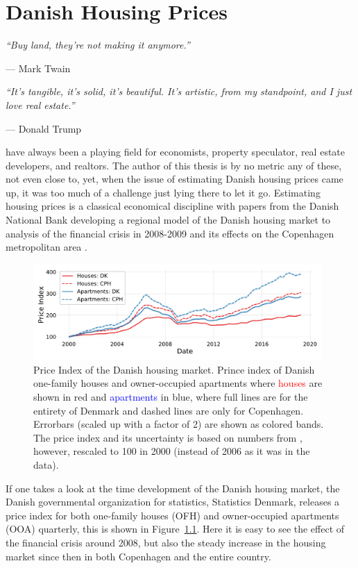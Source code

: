 
\chapter{Danish Housing Prices}
\label{ch:housing_price_analysis}
\epigraph{\textit{``Buy land, they’re not making it anymore.''}}{--- Mark Twain}
\epigraph{\textit{``It’s tangible, it’s solid, it’s beautiful. It’s artistic, from my standpoint, and I just love real estate.''}}{--- Donald Trump}
 have always been a playing field for economists, property speculator, real estate developers, and realtors. The author of this thesis is by no metric any of these, not even close to, yet, when the issue of estimating Danish housing prices came up, it was too much of a challenge just lying there to let it go. Estimating housing prices is a classical economical discipline with papers from the Danish National Bank developing a regional model of the Danish housing market \autocite{hviidWorkingPaperRegional2017} to analysis of the financial crisis in 2008-2009 and its effects on the Copenhagen metropolitan area \autocite{mulalicFinancialCrisisDiverging2017}. 

\begin{figure}
  \includegraphics[width=0.98\textwidth, trim=10 20 10 10, clip]{figures/housing_price_index_dst/housingindex_wide.pdf}
  \caption[Danish Housing Price Index]
          {Price Index of the Danish housing market. Prince index of Danish one-family houses and owner-occupied apartments where \textcolor{red}{houses} are shown in red and \textcolor{blue}{apartments} in blue, where full lines are for the entirety of Denmark and dashed lines are only for Copenhagen. Errorbars (scaled up with a factor of 2) are shown as colored bands. The price index and its uncertainty is based on numbers from \citet{dstPriceIndexEJ14}, however, rescaled to 100 in 2000 (instead of 2006 as it was in the data).}
  \label{fig:h:price_index}
\end{figure}

If one takes a look at the time development of the Danish housing market, the Danish governmental organization for statistics, Statistics Denmark, releases a price index \citep{dstPriceIndexEJ14} for both one-family houses (OFH) and owner-occupied apartments (OOA) quarterly, this is shown in Figure~\ref{fig:h:price_index}. Here it is easy to see the effect of the financial crisis around 2008, but also the steady increase in the housing market since then in both Copenhagen and the entire country. 

